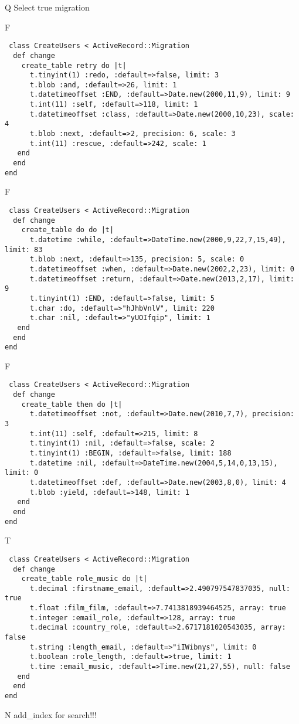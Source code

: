 Q
Select true migration

F
\begin{verbatim}
 class CreateUsers < ActiveRecord::Migration 
  def change 
    create_table retry do |t| 
      t.tinyint(1) :redo, :default=>false, limit: 3
      t.blob :and, :default=>26, limit: 1
      t.datetimeoffset :END, :default=>Date.new(2000,11,9), limit: 9
      t.int(11) :self, :default=>118, limit: 1
      t.datetimeoffset :class, :default=>Date.new(2000,10,23), scale: 4
      t.blob :next, :default=>2, precision: 6, scale: 3
      t.int(11) :rescue, :default=>242, scale: 1
   end 
  end 
end
\end{verbatim}

F
\begin{verbatim}
 class CreateUsers < ActiveRecord::Migration 
  def change 
    create_table do do |t| 
      t.datetime :while, :default=>DateTime.new(2000,9,22,7,15,49), limit: 83
      t.blob :next, :default=>135, precision: 5, scale: 0
      t.datetimeoffset :when, :default=>Date.new(2002,2,23), limit: 0
      t.datetimeoffset :return, :default=>Date.new(2013,2,17), limit: 9
      t.tinyint(1) :END, :default=>false, limit: 5
      t.char :do, :default=>"hJhbVnlV", limit: 220
      t.char :nil, :default=>"yUOIfqip", limit: 1
   end 
  end 
end
\end{verbatim}

F
\begin{verbatim}
 class CreateUsers < ActiveRecord::Migration 
  def change 
    create_table then do |t| 
      t.datetimeoffset :not, :default=>Date.new(2010,7,7), precision: 3
      t.int(11) :self, :default=>215, limit: 8
      t.tinyint(1) :nil, :default=>false, scale: 2
      t.tinyint(1) :BEGIN, :default=>false, limit: 188
      t.datetime :nil, :default=>DateTime.new(2004,5,14,0,13,15), limit: 0
      t.datetimeoffset :def, :default=>Date.new(2003,8,0), limit: 4
      t.blob :yield, :default=>148, limit: 1
   end 
  end 
end
\end{verbatim}

T
\begin{verbatim}
 class CreateUsers < ActiveRecord::Migration 
  def change 
    create_table role_music do |t| 
      t.decimal :firstname_email, :default=>2.490797547837035, null: true
      t.float :film_film, :default=>7.7413818939464525, array: true
      t.integer :email_role, :default=>128, array: true
      t.decimal :country_role, :default=>2.6717181020543035, array: false
      t.string :length_email, :default=>"iIWibnys", limit: 0
      t.boolean :role_length, :default=>true, limit: 1
      t.time :email_music, :default=>Time.new(21,27,55), null: false
   end 
  end 
end
\end{verbatim}
N
add_index for search!!!
  
